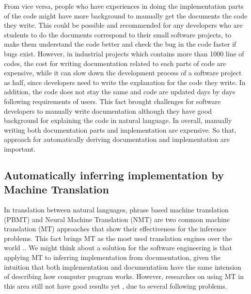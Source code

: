 From vice versa, people who have experiences in doing the implementation parts of the code might have more background to manually get the documents the code they write. This could be possible and recommended for any developers who are students to do the documents correspond to their small software projects, to make them understand the code better and check the bug in the code faster if bugs exist. However, in industrial projects which contains more than 1000 line of codes, the cost for writing documentation related to each parts of code are expensive, while it can slow down the development process of a software project as half, since developers need to write the explanation for the code they write. In addition, the code does not stay the same and code are updated days by days following requirements of users. This fact brought challenges for software developers to manually write documentation although they have good background for explaining the code in natural language. In overall, manually writing both documentation parts and implementation  are expensive. So that, approach for automatically deriving documentation and implementation are important.

\subsection{Automatically  inferring implementation by Machine Translation }
 In translation between natural languages, phrase based machine translation (PBMT) and Neural Machine Translation (NMT) are two common machine translation (MT) approaches that show their effectiveness for the inference problems. This fact brings MT as the most used translation engines over the world \cite{}.. We might think about a solution for the software engineering is that applying MT to inferring implementation from documentation, given the intuition that both implementation and documentation have the same intension of describing how computer program works. However, researches on using MT in this area still not have good results yet \cite{}, due to several following problems.
